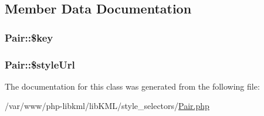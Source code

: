 \subsection{Member Data Documentation}
\hypertarget{classPair_a1483bc5250d2b0dd06021f2b6077e015}{
\subsubsection[{\$key}]{\setlength{\rightskip}{0pt plus 5cm}Pair::\$key}}
\label{d0/d04/classPair_a1483bc5250d2b0dd06021f2b6077e015}
\hypertarget{classPair_ad31b5badb609fa071ef67aaa8bc0feb8}{
\subsubsection[{\$styleUrl}]{\setlength{\rightskip}{0pt plus 5cm}Pair::\$styleUrl}}
\label{d0/d04/classPair_ad31b5badb609fa071ef67aaa8bc0feb8}


The documentation for this class was generated from the following file:\begin{DoxyCompactItemize}
\item 
/var/www/php-\/libkml/libKML/style\_\-selectors/\hyperlink{Pair_8php}{Pair.php}\end{DoxyCompactItemize}
